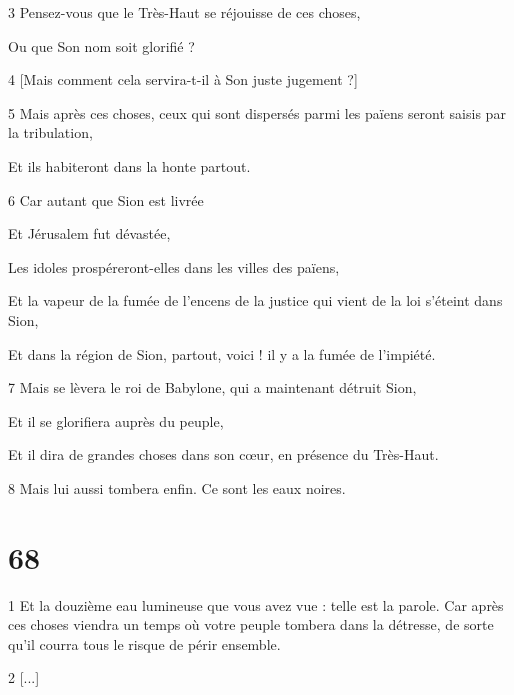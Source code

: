 \par 3 Pensez-vous que le Très-Haut se réjouisse de ces choses,

\par Ou que Son nom soit glorifié ?

\par 4 [Mais comment cela servira-t-il à Son juste jugement ?]

\par 5 Mais après ces choses, ceux qui sont dispersés parmi les païens seront saisis par la tribulation,

\par Et ils habiteront dans la honte partout.

\par 6 Car autant que Sion est livrée

\par Et Jérusalem fut dévastée,

\par Les idoles prospéreront-elles dans les villes des païens,

\par Et la vapeur de la fumée de l'encens de la justice qui vient de la loi s'éteint dans Sion,

\par Et dans la région de Sion, partout, voici ! il y a la fumée de l'impiété.

\par 7 Mais se lèvera le roi de Babylone, qui a maintenant détruit Sion,

\par Et il se glorifiera auprès du peuple,

\par Et il dira de grandes choses dans son cœur, en présence du Très-Haut.

\par 8 Mais lui aussi tombera enfin. Ce sont les eaux noires.

\chapter{68}

\par 1 Et la douzième eau lumineuse que vous avez vue : telle est la parole. Car après ces choses viendra un temps où votre peuple tombera dans la détresse, de sorte qu'il courra tous le risque de périr ensemble.

\par 2 [...]

